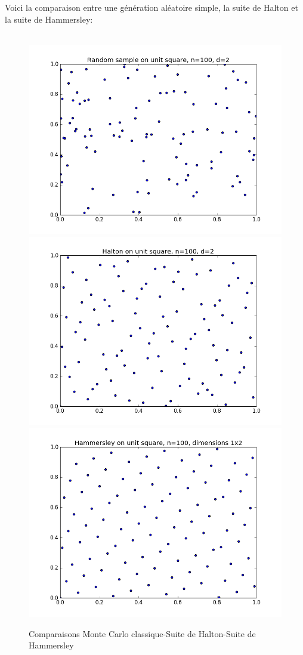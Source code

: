 \documentclass[12pt]{report}
\begin{document}
Voici la comparaison entre une génération aléatoire simple, la suite de Halton et la suite de Hammersley:\\\\
\begin{figure}[!h]
	\centering
	\includegraphics[scale=0.4]{figure_2-halton-random-sample.png}
	\includegraphics[scale=0.4]{figure_2-halton-halton.png}
	\includegraphics[scale=0.4]{figure_3-hammersley.png}
	\caption{Comparaisons Monte Carlo classique-Suite de Halton-Suite de Hammersley}	
\end{figure}
\end{document}
